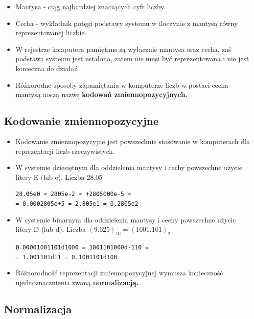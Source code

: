 \documentclass[12pt]{article}
\begin{document}
    \begin{itemize}
        \item Mantysa - ciąg najbardziej znaczących cyfr liczby.
        \item Cecha - wykładnik potęgi podstawy systemu w iloczynie z mantysą równy reprezentowanej liczbie.
        \item W rejestrze komputera pamiętane są wyłącznie mantysa oraz cecha, zaś podstawa systemu jest ustalona, zatem nie musi być reprezentowana i nie jest konieczna do działań.
        \item Różnorodne sposoby zapamiętania w komputerze liczb w postaci cecha-mantysą noszą nazwę \textbf{kodowań zmiennopozycyjnych.}

    \end{itemize}

    \subsection{Kodowanie zmiennopozycyjne}
    \begin{itemize}
        \item Kodowanie zmiennopozycyjne jest powszechnie stosowanie w komputerach dla reprezentacji liczb rzeczywistych.
        \item W systemie dziesiętnym dla oddzielenia mantysy i cechy powszechne użycie litery E (lub e).
        Liczba 28.05
        \begin{center}
            \texttt{28.05e0 = 2805e-2 = +2805000e-5 =\\
            = 0.0002805e+5 = 2.805e1 = 0.2805e2}
        \end{center}

        \item W systemie binarnym dla oddzielenia mantysy i cechy powszechne użycie litery D (lub d).
        Liczba $(9.625)_{10} = (1001.101)_2$
        \begin{center}
            \texttt{0.00001001101d1000 = 1001101000d-110 =\\
            = 1.001101d11 = 0.1001101d100}
        \end{center}

        \item Różnorodność reprezentacji zmiennopozycyjnej wymusza konieczność ujednoznacznienia zwaną \textbf{normalizacją.}

    \end{itemize}

    \subsection{Normalizacja}
\end{document}
